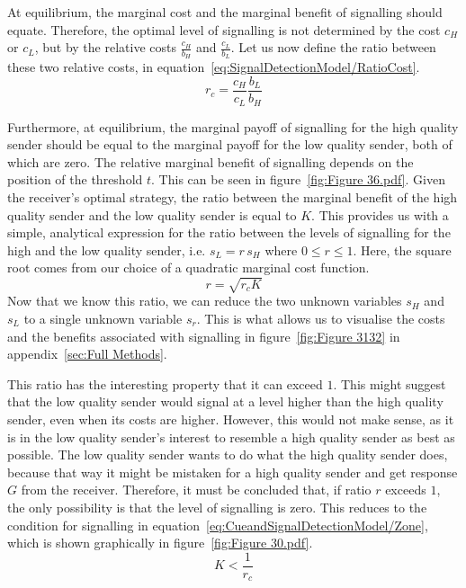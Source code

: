 \documentclass[a4paper,12pt]{article}
\numberwithin{equation}{section}
\begin{document}
At equilibrium, the marginal cost and the marginal benefit of signalling should equate. Therefore, the optimal level of signalling is not determined by the cost $c_{H}$ or $c_{L}$, but by the relative costs $\frac{c_{H}}{b_{H}}$ and $\frac{c_{L}}{b_{L}}$. Let us now define the ratio between these two relative costs, in equation~\ref{eq:SignalDetectionModel/RatioCost}.
\begin{equation}
\label{eq:SignalDetectionModel/RatioCost}
r_{c} = \frac{c_{H}}{c_{L}} \frac{b_{L}}{b_{H}}
\end{equation}

Furthermore, at equilibrium, the marginal payoff of signalling for the high quality sender should be equal to the marginal payoff for the low quality sender, both of which are zero. The relative marginal benefit of signalling depends on the position of the threshold $t$. This can be seen in figure~\ref{fig:Figure 36.pdf}. Given the receiver's optimal strategy, the ratio between the marginal benefit of the high quality sender and the low quality sender is equal to $K$.  This provides us with a simple, analytical expression for the ratio between the levels of signalling for the high and the low quality sender, i.e. $s_{L}=r \, s_{H}$ where $0 \leq r \leq 1$. Here, the square root comes from our choice of a quadratic marginal cost function.
\begin{equation}
\label{eq:CueandSignalDetectionModel/Ratio}
r=\sqrt{r_{c} K}
\end{equation}
Now that we know this ratio, we can reduce the two unknown variables $s_{H}$ and $s_{L}$ to a single unknown variable $s_{r}$. This is what allows us to visualise the costs and the benefits associated with signalling in figure~\ref{fig:Figure 3132} in appendix~\ref{sec:Full Methods}.

This ratio has the interesting property that it can exceed $1$. This might suggest that the low quality sender would signal at a level higher than the high quality sender, even when its costs are higher. However, this would not make sense, as it is in the low quality sender's interest to resemble a high quality sender as best as possible. The low quality sender wants to do what the high quality sender does, because that way it might be mistaken for a high quality sender and get response $G$ from the receiver. Therefore, it must be concluded that, if ratio $r$ exceeds $1$, the only possibility is that the level of signalling is zero. This reduces to the condition for signalling in equation~\ref{eq:CueandSignalDetectionModel/Zone}, which is shown graphically in figure~\ref{fig:Figure 30.pdf}.
\begin{equation}
\label{eq:CueandSignalDetectionModel/Zone}
K <\frac{1}{r_{c}}
\end{equation}
\end{document}
